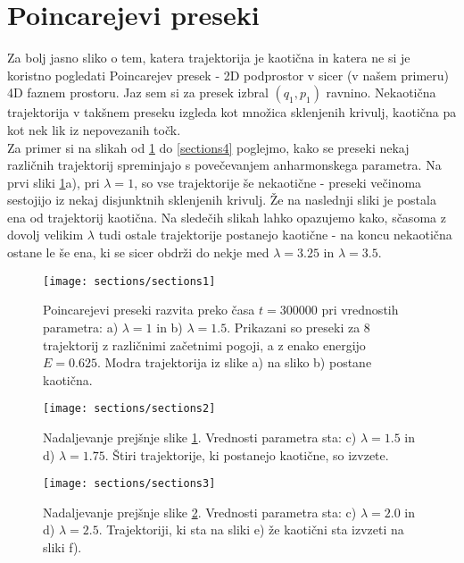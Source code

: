 \documentclass[a4paper]{article}
\begin{document}
    \section{Poincarejevi preseki}

    Za bolj jasno sliko o tem, katera trajektorija je kaotična in katera ne si je koristno pogledati Poincarejev presek - 2D podprostor
    v sicer (v našem primeru) 4D faznem prostoru. Jaz sem si za presek izbral $(q_1, p_1)$ ravnino. Nekaotična trajektorija v takšnem preseku
    izgleda kot množica sklenjenih krivulj, kaotična pa kot nek lik iz nepovezanih točk. \\
    Za primer si na slikah od \ref{sections1} do \ref{sections4} poglejmo, kako se preseki nekaj različnih trajektorij spreminjajo s povečevanjem
    anharmonskega parametra. Na prvi sliki \ref{sections1}a), pri $\lambda = 1$, so vse trajektorije še nekaotične - preseki večinoma
    sestojijo iz nekaj disjunktnih sklenjenih krivulj. Že na naslednji sliki je postala ena od trajektorij kaotična. Na sledečih slikah
    lahko opazujemo kako, sčasoma z dovolj velikim $\lambda$ tudi ostale trajektorije postanejo kaotične - na koncu nekaotična ostane
    le še ena, ki se sicer obdrži do nekje med $\lambda = 3.25$ in $\lambda = 3.5$.
    
    \begin{figure}
        \centering
        \texttt{[image: sections/sections1]}
        \caption{Poincarejevi preseki razvita preko časa $t = 300000$ pri vrednostih parametra:
        a) $\lambda = 1$ in
        b) $\lambda = 1.5$.
        Prikazani so preseki za 8 trajektorij z različnimi začetnimi pogoji, a z enako energijo $E = 0.625$.
        Modra trajektorija iz slike a) na sliko b) postane kaotična.}
        \label{sections1}
    \end{figure}
 
    \begin{figure}
        \centering
        \texttt{[image: sections/sections2]}
        \caption{Nadaljevanje prejšnje slike \ref{sections1}. Vrednosti parametra sta:
        c) $\lambda = 1.5$ in
        d) $\lambda = 1.75$.
        Štiri trajektorije, ki postanejo kaotične, so izvzete.}
        \label{sections2}
    \end{figure}
 
    \begin{figure}
        \centering
        \texttt{[image: sections/sections3]}
        \caption{Nadaljevanje prejšnje slike \ref{sections2}. Vrednosti parametra sta:
        c) $\lambda = 2.0$ in
        d) $\lambda = 2.5$.
        Trajektoriji, ki sta na sliki e) že kaotični sta izvzeti na sliki f).}
        \label{sections3}
    \end{figure}
 
\end{document}
